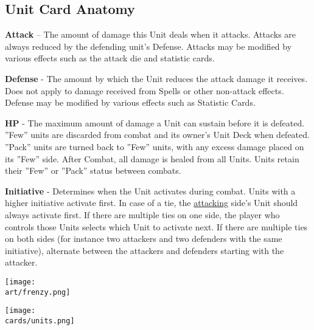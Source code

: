 \begin{multicols}{2}
\subsection*{Unit Card Anatomy}

\vspace{0pt}

\textbf{Attack} – The amount of damage this Unit deals when it attacks.
Attacks are always reduced by the defending unit's Defense.
Attacks may be modified by various effects such as the attack die and statistic cards.\par
\textbf{Defense} - The amount by which the Unit reduces the attack damage it receives.
Does not apply to damage received from Spells or other non-attack effects.
Defense may be modified by various effects such as Statistic Cards.\par
\textbf{\hypertarget{HP}{HP}} - The maximum amount of damage a Unit can sustain before it is defeated.
”Few” units are discarded from combat and its owner's Unit Deck when defeated.
”Pack” units are turned back to ”Few” units, with any excess damage placed on its ”Few” side.
After Combat, all damage is healed from all Units.
Units retain their ”Few” or ”Pack” status between combats.\par
{\hypertarget{Initiative}{\textbf{Initiative}}} - Determines when the Unit activates during combat.
Units with a higher initiative activate first.
In case of a tie, the \hyperlink{Combatterminology}{attacking} side's Unit should always activate first.
If there are multiple ties on one side, the player who controls those Units selects which Unit to activate next.
If there are multiple ties on both sides (for instance two attackers and two defenders with the same initiative), alternate between the attackers and defenders starting with the attacker.\par
\bigskip

\begin{scaledfigure}[blanker]
	\centering
	\texttt{[image: \\art/frenzy.png]}
\end{scaledfigure}

\begin{center}
  \texttt{[image: \\cards/units.png]}
\end{center}
\bigskip


\end{multicols}
